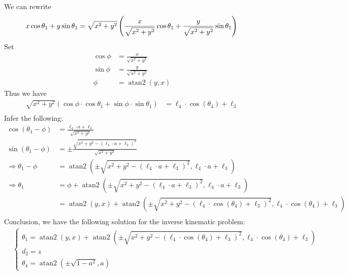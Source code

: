     We can rewrite
    \begin{equation*}
        x \cos \theta_1 + y \sin \theta_1 = \sqrt{x^2 + y^2} \left( \frac{x}{\sqrt{x^2 + y^2}} \cos \theta_1 + \frac{y}{\sqrt{x^2 + y^2}} \sin \theta_1 \right) \\
    \end{equation*}
    Set
    \begin{align*} 
        \cos \phi &= \frac{x}{\sqrt{x^2 + y^2}} \\
        \sin \phi &= \frac{y}{\sqrt{x^2 + y^2}} \\
        \phi &= \operatorname{atan2}(y, x) 
    \end{align*}
    Thus we have
    \begin{align*}
        \sqrt{x^2 + y^2} \left( \cos \phi \cdot \cos \theta_1 + \sin \phi \cdot \sin \theta_1 \right) &= \ell_4 \cdot \cos(\theta_4) + \ell_3 \\
    \end{align*}
    Infer the following:
    \begin{align*}
        \cos(\theta_1 - \phi) &= \frac{\ell_4 \cdot a + \ell_3}{\sqrt{x^2 + y^2}} \\
        \sin(\theta_1 - \phi) &= \pm \frac{\sqrt{x^2 + y^2 - \left( \ell_4 \cdot a + \ell_3 \right)^2}}{\sqrt{x^2 + y^2}} \\
        \Rightarrow  \theta_1 - \phi &= \operatorname{atan2}\left( \pm \sqrt{x^2 + y^2 - \left( \ell_4 \cdot a + \ell_3 \right)^2}, \ell_4 \cdot a + \ell_3 \right) \\
        \Rightarrow  \theta_1 &= \phi + \operatorname{atan2}\left( \pm \sqrt{x^2 + y^2 - \left( \ell_4 \cdot a + \ell_3 \right)^2}, \ell_4 \cdot a + \ell_3 \right) \\
        &= \operatorname{atan2}(y, x) + \operatorname{atan2}\left( \pm \sqrt{x^2 + y^2 - \left( \ell_4 \cdot \cos(\theta_4) + \ell_3 \right)^2}, \ell_4 \cdot \cos(\theta_4) + \ell_3 \right) \\
    \end{align*}
    Conclusion, we have the following solution for the inverse kinematic problem:
    \begin{align*}
        &\begin{cases}
        \theta_1 = \operatorname{atan2}(y, x) + \operatorname{atan2}\left( \pm \sqrt{x^2 + y^2 - \left( \ell_4 \cdot \cos(\theta_4) + \ell_3 \right)^2}, \ell_4 \cdot \cos(\theta_4) + \ell_3 \right) \\
        d_2 = z \\
        \theta_4 = \operatorname{atan2}\left(\pm \sqrt{1 - a^2}, a \right)
        \end{cases} \\
    \end{align*}
